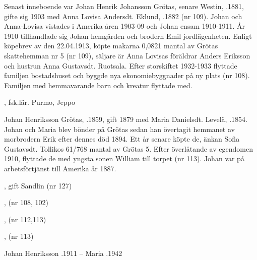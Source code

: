 
Senast inneboende var Johan Henrik Johansson Grötas, senare Westin, .1881, gifte sig 1903 med Anna Lovisa Andersdt. Eklund, .1882 (nr 109). Johan och Anna-Lovisa vistades i Amerika åren 1903-09 och Johan ensam 1910-1911. År 1910 tillhandlade sig Johan hemgården och brodern Emil jordlägenheten. Enligt köpebrev av den 22.04.1913, köpte makarna 0,0821 mantal av Grötas skattehemman nr 5 (nr 109), säljare är Anna Lovisas föräldrar Anders Eriksson och hustrun Anna Gustavsdt. Ruotsala. Efter storskiftet 1932-1933 flyttade familjen bostadshuset och byggde nya ekonomiebyggnader på ny plats (nr 108). Familjen med hemmavarande barn och kreatur flyttade med.
\begin{jhchildren}
  \item {}, fsk.lär. Purmo, Jeppo
  \item {}
  \item {}
  \item {}
  \item {}
  \item {}
  \item {}
  \item {}
  \item {}
  \item {}
\end{jhchildren}


Johan Henriksson Grötas, .1859, gift 1879 med Maria Danielsdt. Levelä, .1854. Johan och Maria blev bönder på Grötas sedan han övertagit hemmanet av morbrodern Erik efter dennes död 1894. Ett år senare köpte de, änkan Sofia Gustavsdt. Tollikos 61/768 mantal av Grötas 5.  Efter överlåtande av egendomen 1910, flyttade de med yngsta sonen William till torpet (nr 113). Johan var på arbetsförtjänst till Amerika år 1887.
\begin{jhchildren}
  \item {}, gift Sandlin (nr 127)
  \item {}, (nr 108, 102)
  \item {}, (nr 112,113)
  \item {}
  \item {}, (nr 113)
\end{jhchildren}
Johan Henriksson .1911  --  Maria .1942


